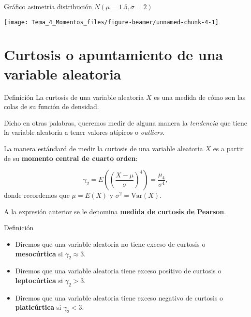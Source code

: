 \documentclass[
  ignorenonframetext,
  aspectratio=169]{beamer}
\begin{document}
\begin{frame}{Gráfico asimetría distribución \(N(\mu=1.5, \sigma=2)\)}
\protect\hypertarget{gruxe1fico-asimetruxeda-distribuciuxf3n-nmu1.5-sigma2}{}
\begin{center}\texttt{[image: Tema\_4\_Momentos\_files/figure-beamer/unnamed-chunk-4-1]} \end{center}
\end{frame}

\hypertarget{curtosis-o-apuntamiento-de-una-variable-aleatoria}{%
\section{Curtosis o apuntamiento de una variable
aleatoria}\label{curtosis-o-apuntamiento-de-una-variable-aleatoria}}

\begin{frame}{Definición}
\protect\hypertarget{definiciuxf3n-1}{}
La curtosis de una variable aleatoria \(X\) es una medida de cómo son
las colas de su función de densidad.

Dicho en otras palabras, queremos medir de alguna manera la
\emph{tendencia} que tiene la variable aleatoria a tener valores
atípicos o \emph{outliers}.

La manera estándard de medir la curtosis de una variable aleatoria \(X\)
es a partir de su \textbf{momento central de cuarto orden}:

\[
\gamma_2 = E\left(\left(\frac{X-\mu}{\sigma}\right)^4\right) = \frac{\mu_4}{\sigma^4},
\] donde recordemos que \(\mu=E(X)\) y \(\sigma^2 =\mathrm{Var}(X)\).

A la expresión anterior se le denomina \textbf{medida de curtosis de
Pearson}.
\end{frame}

\begin{frame}{Definición}
\protect\hypertarget{definiciuxf3n-2}{}
\begin{itemize}
\item
  Diremos que una variable aleatoria no tiene exceso de curtosis o
  \textbf{mesocúrtica} si \(\gamma_2 \approx 3\).
\item
  Diremos que una variable aleatoria tiene exceso positivo de curtosis o
  \textbf{leptocúrtica} si \(\gamma_2 >3\).
\item
  Diremos que una variable aleatoria tiene exceso negativo de curtosis o
  \textbf{platicúrtica} si \(\gamma_2 <3\).
\end{itemize}
\end{frame}
\end{document}
